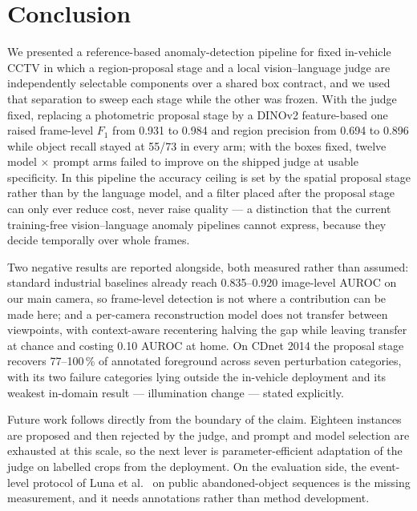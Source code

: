 \section{Conclusion}
\label{sec:conclusion}

We presented a reference-based anomaly-detection pipeline for fixed in-vehicle
CCTV in which a region-proposal stage and a local vision--language judge are
independently selectable components over a shared box contract, and we used
that separation to sweep each stage while the other was frozen. With the judge
fixed, replacing a photometric proposal stage by a DINOv2 feature-based one
raised frame-level $F_1$ from 0.931 to 0.984 and region precision from 0.694 to
0.896 while object recall stayed at 55/73 in every arm; with the boxes fixed,
twelve model $\times$ prompt arms failed to improve on the shipped judge at
usable specificity. In this pipeline the accuracy ceiling is set by the spatial
proposal stage rather than by the language model, and a filter placed after the
proposal stage can only ever reduce cost, never raise quality --- a distinction
that the current training-free vision--language anomaly pipelines cannot express,
because they decide temporally over whole frames.

Two negative results are reported alongside, both measured rather than assumed:
standard industrial baselines already reach 0.835--0.920 image-level AUROC on
our main camera, so frame-level detection is not where a contribution can be
made here; and a per-camera reconstruction model does not transfer between
viewpoints, with context-aware recentering halving the gap while leaving
transfer at chance and costing 0.10 AUROC at home. On CDnet 2014 the proposal
stage recovers 77--100\,\% of annotated foreground across seven perturbation
categories, with its two failure categories lying outside the in-vehicle
deployment and its weakest in-domain result --- illumination change --- stated
explicitly.

Future work follows directly from the boundary of the claim. Eighteen instances
are proposed and then rejected by the judge, and prompt and model selection are
exhausted at this scale, so the next lever is parameter-efficient adaptation of
the judge on labelled crops from the deployment. On the evaluation side, the
event-level protocol of Luna et al.~\cite{Luna_2018} on public
abandoned-object sequences is the missing measurement, and it needs annotations
rather than method development.
